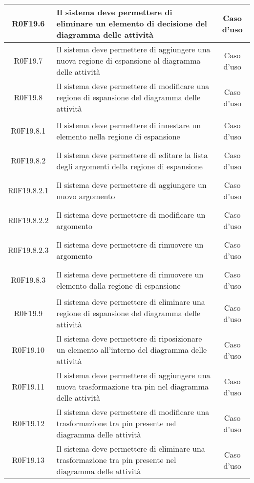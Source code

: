 \documentclass[../AnalisiDeiRequisiti.tex]{subfiles}
\begin{document}
\begin{longtable}{|c|>{\centering}p{7cm}|c|}
	\hypertarget{R0F19.6}{R0F19.6} & Il sistema deve permettere di eliminare un elemento di decisione del diagramma delle attività & Caso d'uso \\ \hline
	\hypertarget{R0F19.7}{R0F19.7} & Il sistema deve permettere di aggiungere una nuova regione di espansione al diagramma delle attività & Caso d'uso \\ \hline
	\hypertarget{R0F19.8}{R0F19.8} & Il sistema deve permettere di modificare una regione di espansione del diagramma delle attività & Caso d'uso \\ \hline
	\hypertarget{R0F19.8.1}{R0F19.8.1} & Il sistema deve permettere di innestare un elemento nella regione di espansione & Caso d'uso \\ \hline
	\hypertarget{R0F19.8.2}{R0F19.8.2} & Il sistema deve permettere di editare la lista degli argomenti della regione di espansione & Caso d'uso \\ \hline
	\hypertarget{R0F19.8.2.1}{R0F19.8.2.1} & Il sistema deve permettere di aggiungere un nuovo argomento & Caso d'uso \\ \hline
	\hypertarget{R0F19.8.2.2}{R0F19.8.2.2} & Il sistema deve permettere di modificare un argomento & Caso d'uso \\ \hline
	\hypertarget{R0F19.8.2.3}{R0F19.8.2.3} & Il sistema deve permettere di rimuovere un argomento & Caso d'uso \\ \hline
	\hypertarget{R0F19.8.3}{R0F19.8.3} & Il sistema deve permettere di rimuovere un elemento dalla regione di espansione & Caso d'uso \\ \hline
	\hypertarget{R0F19.9}{R0F19.9} & Il sistema deve permettere di eliminare una regione di espansione del diagramma delle attività & Caso d'uso \\ \hline
	\hypertarget{R0F19.10}{R0F19.10} & Il sistema deve permettere di riposizionare un elemento all'interno del diagramma delle attività & Caso d'uso \\ \hline
	\hypertarget{R0F19.11}{R0F19.11} & Il sistema deve permettere di aggiungere una nuova trasformazione tra pin nel diagramma delle attività & Caso d'uso \\ \hline
	\hypertarget{R0F19.12}{R0F19.12} & Il sistema deve permettere di modificare una trasformazione tra pin presente nel diagramma delle attività & Caso d'uso \\ \hline
	\hypertarget{R0F19.13}{R0F19.13} & Il sistema deve permettere di eliminare una trasformazione tra pin presente nel diagramma delle attività & Caso d'uso \\ \hline

\end{longtable}
\end{document}
